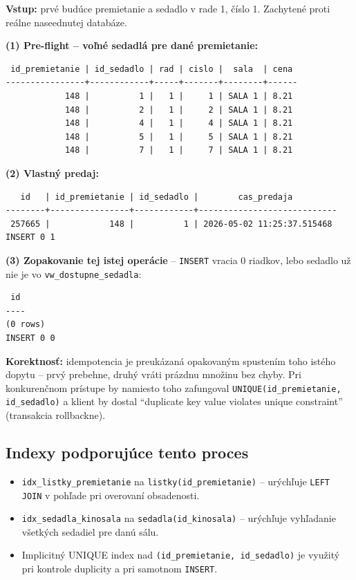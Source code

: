 \documentclass[11pt, a4paper]{article}
\begin{document}
\textbf{Vstup:} prvé budúce premietanie a sedadlo v rade 1, číslo 1.
Zachytené proti reálne naseednutej databáze.

\textbf{(1) Pre-flight -- voľné sedadlá pre dané premietanie:}
\begin{verbatim}
 id_premietanie | id_sedadlo | rad | cislo |  sala  | cena
----------------+------------+-----+-------+--------+------
            148 |          1 |   1 |     1 | SALA 1 | 8.21
            148 |          2 |   1 |     2 | SALA 1 | 8.21
            148 |          4 |   1 |     4 | SALA 1 | 8.21
            148 |          5 |   1 |     5 | SALA 1 | 8.21
            148 |          7 |   1 |     7 | SALA 1 | 8.21
\end{verbatim}

\textbf{(2) Vlastný predaj:}
\begin{verbatim}
   id   | id_premietanie | id_sedadlo |        cas_predaja
--------+----------------+------------+----------------------------
 257665 |            148 |          1 | 2026-05-02 11:25:37.515468
INSERT 0 1
\end{verbatim}

\textbf{(3) Zopakovanie tej istej operácie} -- \texttt{INSERT} vracia
0 riadkov, lebo sedadlo už nie je vo \texttt{vw\_dostupne\_sedadla}:
\begin{verbatim}
 id
----
(0 rows)
INSERT 0 0
\end{verbatim}

\textbf{Korektnosť:} idempotencia je preukázaná opakovaným spustením
toho istého dopytu -- prvý prebehne, druhý vráti prázdnu množinu bez
chyby. Pri konkurenčnom prístupe by namiesto toho zafungoval
\texttt{UNIQUE(id\_premietanie, id\_sedadlo)} a klient by dostal
``duplicate key value violates unique constraint'' (transakcia rollbackne).

\subsection{Indexy podporujúce tento proces}

\begin{itemize}
    \item \texttt{idx\_listky\_premietanie} na \texttt{listky(id\_premietanie)}
    -- urýchľuje \texttt{LEFT JOIN} v pohľade pri overovaní obsadenosti.
    \item \texttt{idx\_sedadla\_kinosala} na \texttt{sedadla(id\_kinosala)}
    -- urýchľuje vyhľadanie všetkých sedadiel pre danú sálu.
    \item Implicitný UNIQUE index nad \texttt{(id\_premietanie, id\_sedadlo)}
    je využitý pri kontrole duplicity a pri samotnom \texttt{INSERT}.
\end{itemize}
\end{document}
